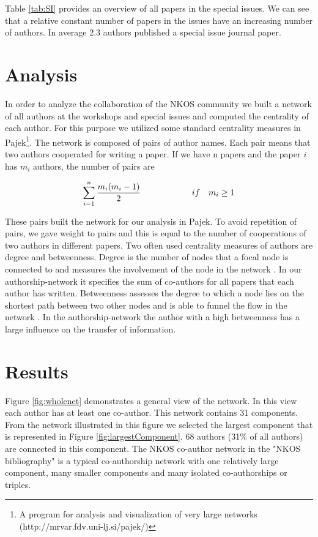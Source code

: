 \documentclass[runningheads,a4paper]{llncs}
\begin{document}
Table \ref{tab:SI} provides an overview of all papers in the special issues. We can see that a relative constant number of papers in the issues have an increasing number of authors. In average 2.3 authors published a special issue journal paper.

\section{Analysis}\label{analysis}

In order to analyze the collaboration of the NKOS community we built a network of all authors at the workshops and special issues and computed the centrality of each author. For this purpose we utilized some standard centrality measures in Pajek\footnote{A program for analysis and visualization of very large networks (http://mrvar.fdv.uni-lj.si/pajek/)}. The network is composed of pairs of author names. Each pair means that two authors cooperated for writing a paper. If we have n papers and the paper \textit{i} has $m_i$ authors, the number of pairs are 

\begin{equation}\sum\limits_{i=1}^n \frac{m_i(m_i-1)}{2} \qquad \qquad \qquad if\quad m_i\ge 1\\
\end{equation}

These pairs built the network for our analysis in Pajek. To avoid repetition of pairs, we gave weight to pairs and this is equal to the number of cooperations of two authors in different papers. 
Two often used centrality measures of authors are degree and betweenness. Degree is the number of nodes that a focal node is connected to and measures the involvement of the node in the network \cite{Opsahl2010}. In our authorship-network it specifies the sum of co-authors for all papers that each author has written. Betweenness assesses the degree to which a node lies on the shortest path between two other nodes and is able to funnel the flow in the network \cite{Opsahl2010}. In the authorship-network the author with a high betweenness has a large influence on the transfer of information. 

\section{Results}\label{results}

Figure \ref{fig:wholenet} demonstrates a general view of the network. In this view each author has at least one co-author. This network contains 31 components. From the network illustrated in this figure we selected the largest component that is represented in Figure \ref{fig:largestComponent}. 68 authors (31\% of all authors) are connected in this component.  The NKOS co-author network in the "NKOS bibliography" is a typical co-authorship network with one relatively large component, many smaller components and many isolated co-authorships or triples.
\end{document}
